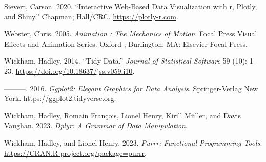 \begin{CSLReferences}{1}{0}
\leavevmode{}%
Sievert, Carson. 2020. {``Interactive {Web-Based} Data Visualization with r, Plotly, and Shiny.''} Chapman; Hall/CRC. \url{https://plotly-r.com}.

\leavevmode{}%
Webster, Chris. 2005. \emph{Animation : The Mechanics of Motion}. Focal Press Visual Effects and Animation Series. Oxford ; Burlington, MA: Elsevier Focal Press.

\leavevmode{}%
Wickham, Hadley. 2014. {``Tidy Data.''} \emph{Journal of Statistical Software} 59 (10): 1--23. \url{https://doi.org/10.18637/jss.v059.i10}.

\leavevmode{}%
---------. 2016. \emph{Ggplot2: Elegant Graphics for Data Analysis}. Springer-Verlag New York. \url{https://ggplot2.tidyverse.org}.

\leavevmode{}%
Wickham, Hadley, Romain François, Lionel Henry, Kirill Müller, and Davis Vaughan. 2023. \emph{Dplyr: A Grammar of Data Manipulation}.

\leavevmode{}%
Wickham, Hadley, and Lionel Henry. 2023. \emph{Purrr: Functional Programming Tools}. \url{https://CRAN.R-project.org/package=purrr}.

\end{CSLReferences}



\address{%
Krisanat Anukarnsakulchularp\\
Monash University\\%
Department of Econometrics and Business Statistics\\ Melbourne, Australia\\
%
%
\textit{ORCiD: \href{https://orcid.org/0009-0008-5638-7124}{0009-0008-5638-7124}}\\%
\href{mailto:kanu0003@student.monash.edu}{\nolinkurl{kanu0003@student.monash.edu}}%
}
